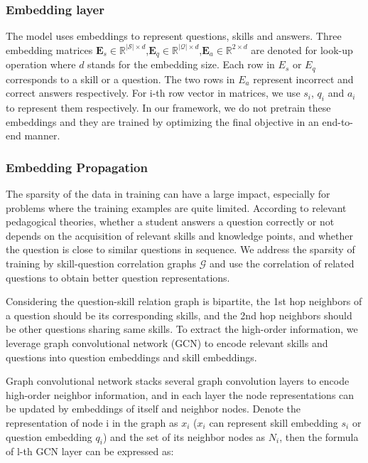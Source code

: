 \documentclass[11pt,en]{elegantpaper}
\begin{document}
\subsubsection{Embedding layer}
The model uses embeddings to represent questions, skills and answers. Three embedding matrices $\mathbf{E}_{s} \in \mathbb{R}^{|\mathcal{S}| \times d}$,$\mathbf{E}_{q} \in \mathbb{R}^{|\mathcal{Q}| \times d}$,$ \mathbf{E}_{a} \in \mathbb{R}^{2 \times d}$ are denoted for look-up operation where $d$ stands for the embedding size. Each row in $E_s$ or $E_q$ corresponds to a skill or a question. The two rows in $E_a$ represent incorrect and correct answers respectively. For i-th row vector in matrices, we use $s_i$, $q_i$ and $a_i$ to represent them respectively. In our framework, we do not pretrain these embeddings and they are trained by optimizing the final objective in an end-to-end manner.

\subsubsection{Embedding Propagation}
The sparsity of the data in training can have a large impact, especially for problems where the training examples are quite limited. According to relevant pedagogical theories, whether a student answers a question correctly or not depends on the acquisition of relevant skills and knowledge points, and whether the question is close to similar questions in sequence. We address the sparsity of training by skill-question correlation graphs $\mathcal{G}$ and use the correlation of related questions to obtain better question representations.

Considering the question-skill relation graph is bipartite, the 1st hop neighbors of a question should be its corresponding skills, and the 2nd hop neighbors should be other questions sharing same skills. To extract the high-order information, we leverage graph convolutional network (GCN) to encode relevant skills and questions into question embeddings and skill embeddings.

Graph convolutional network stacks several graph convolution layers to encode high-order neighbor information, and in each layer the node representations can be updated by embeddings of itself and neighbor nodes. Denote the representation of node i in the graph as $x_i$ ($x_i$ can represent skill embedding $s_i$ or question embedding $q_i$) and the set of its neighbor nodes as $N_i$, then the formula of l-th GCN layer can be expressed as:
\end{document}
